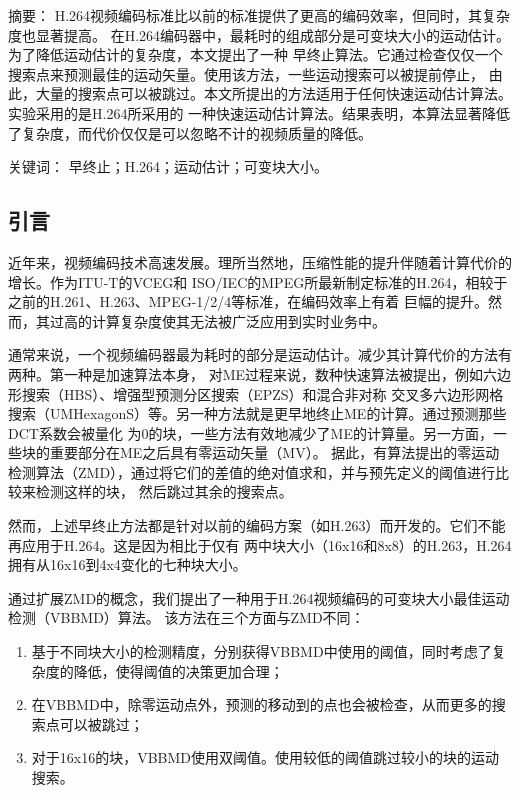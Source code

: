 {\heiti 摘要：} H.264视频编码标准比以前的标准提供了更高的编码效率，但同时，其复杂度也显著提高。
在H.264编码器中，最耗时的组成部分是可变块大小的运动估计。为了降低运动估计的复杂度，本文提出了一种
早终止算法。它通过检查仅仅一个搜索点来预测最佳的运动矢量。使用该方法，一些运动搜索可以被提前停止，
由此，大量的搜索点可以被跳过。本文所提出的方法适用于任何快速运动估计算法。实验采用的是H.264所采用的
一种快速运动估计算法。结果表明，本算法显著降低了复杂度，而代价仅仅是可以忽略不计的视频质量的降低。

{\heiti 关键词：} 早终止；H.264；运动估计；可变块大小。

\subsection{引言}

近年来，视频编码技术高速发展。理所当然地，压缩性能的提升伴随着计算代价的增长。作为ITU-T的VCEG和
ISO/IEC的MPEG所最新制定标准的H.264，相较于之前的H.261、H.263、MPEG-1/2/4等标准，在编码效率上有着
巨幅的提升。然而，其过高的计算复杂度使其无法被广泛应用到实时业务中。

通常来说，一个视频编码器最为耗时的部分是运动估计。减少其计算代价的方法有两种。第一种是加速算法本身，
对ME过程来说，数种快速算法被提出，例如六边形搜索（HBS）、增强型预测分区搜索（EPZS）和混合非对称
交叉多六边形网格搜索（UMHexagonS）等。另一种方法就是更早地终止ME的计算。通过预测那些DCT系数会被量化
为0的块，一些方法有效地减少了ME的计算量。另一方面，一些块的重要部分在ME之后具有零运动矢量（MV）。
据此，有算法提出的零运动检测算法（ZMD），通过将它们的差值的绝对值求和，并与预先定义的阈值进行比较来检测这样的块，
然后跳过其余的搜索点。

然而，上述早终止方法都是针对以前的编码方案（如H.263）而开发的。它们不能再应用于H.264。这是因为相比于仅有
两中块大小（16x16和8x8）的H.263，H.264拥有从16x16到4x4变化的七种块大小。

通过扩展ZMD的概念，我们提出了一种用于H.264视频编码的可变块大小最佳运动检测（VBBMD）算法。
该方法在三个方面与ZMD不同：

\begin{enumerate}
  \item 基于不同块大小的检测精度，分别获得VBBMD中使用的阈值，同时考虑了复杂度的降低，使得阈值的决策更加合理；
  \item 在VBBMD中，除零运动点外，预测的移动到的点也会被检查，从而更多的搜索点可以被跳过；
  \item 对于16x16的块，VBBMD使用双阈值。使用较低的阈值跳过较小的块的运动搜索。
\end{enumerate}

